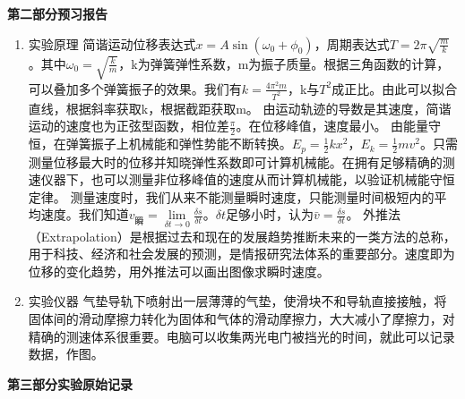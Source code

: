 \documentclass[11pt]{article}
\begin{document}
\newpage
\begin{center}
    \vspace*{1em}
    \Large \bf 第二部分\qquad 预习报告
\end{center}

\begin{enumerate}
    \item 实验原理
	\newline \hspace*{2em}简谐运动位移表达式$x=A\sin(\omega _{0}+ \phi_{0})$，周期表达式$T=2\pi \sqrt{\frac{m}{k}}$。其中$\omega _{0} = \sqrt{\frac{k}{m}}$，k为弹簧弹性系数，m为振子质量。根据三角函数的计算，可以叠加多个弹簧振子的效果。我们有$k= \frac{4\pi ^{2} m}{T^{2}}$，k与$T^{2}$成正比。由此可以拟合直线，根据斜率获取k，根据截距获取m。
	\newline \hspace*{2em}由运动轨迹的导数是其速度，简谐运动的速度也为正弦型函数，相位差$\frac{\pi}{2}$。在位移峰值，速度最小。
	\newline \hspace*{2em}由能量守恒，在弹簧振子上机械能和弹性势能不断转换。$E_{p}=\frac{1}{2} kx^{2}$，$E_{k}=\frac{1}{2} mv^{2}$。只需测量位移最大时的位移并知晓弹性系数即可计算机械能。在拥有足够精确的测速仪器下，也可以测量非位移峰值的速度从而计算机械能，以验证机械能守恒定律。
	\newline \hspace*{2em}测量速度时，我们从来不能测量瞬时速度，只能测量时间极短内的平均速度。我们知道$v_{瞬}=\lim\limits_{\delta t \to 0} \frac{\delta s}{\delta t}$。$\delta t$足够小时，认为$\bar v=\frac{\delta s}{\delta t}$。
	\newline \hspace*{2em}外推法（Extrapolation）是根据过去和现在的发展趋势推断未来的一类方法的总称，用于科技、经济和社会发展的预测，是情报研究法体系的重要部分。速度即为位移的变化趋势，用外推法可以画出图像求瞬时速度。

    \item 实验仪器
	\newline \hspace*{2em}气垫导轨下喷射出一层薄薄的气垫，使滑块不和导轨直接接触，将固体间的滑动摩擦力转化为固体和气体的滑动摩擦力，大大减小了摩擦力，对精确的测速体系很重要。电脑可以收集两光电门被挡光的时间，就此可以记录数据，作图。

\end{enumerate}
\newpage
\begin{center}
    \vspace*{1em}
    \Large \bf 第三部分\qquad 实验原始记录
\end{center}

\end{document}
